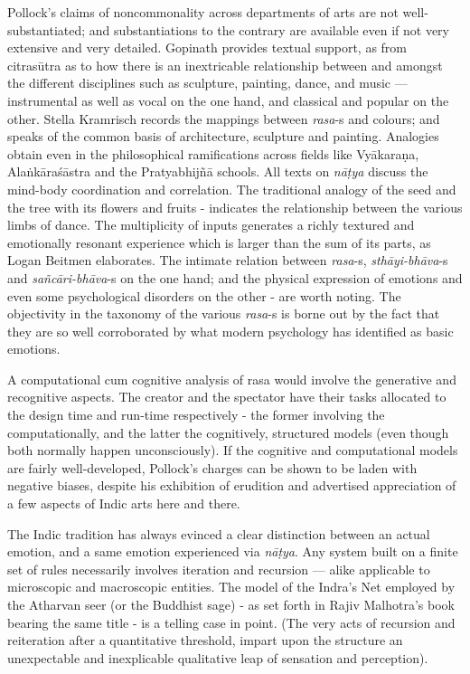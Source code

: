 Pollock’s claims of noncommonality across departments of arts are not well-substantiated; and substantiations to the contrary are available even if not very extensive and very detailed. Gopinath provides textual support, as from citrasūtra as to how there is an inextricable relationship between and amongst the different disciplines such as sculpture, painting, dance, and music --- instrumental as well as vocal on the one hand, and classical and popular on the other. Stella Kramrisch records the mappings between \textsl{rasa}-s and colours; and speaks of the common basis of architecture, sculpture and painting. Analogies obtain even in the philosophical ramifications across fields like Vyākaraṇa, Alaṅkāraśāstra and the Pratyabhijñā schools. All texts on \textsl{nāṭya} discuss the mind-body coordination and correlation. The traditional analogy of the seed and the tree with its flowers and fruits - indicates the relationship between the various limbs of dance. The multiplicity of inputs generates a richly textured and emotionally resonant experience which is larger than the sum of its parts, as Logan Beitmen elaborates. The intimate relation between \textsl{rasa}-s, \textsl{sthāyi-bhāva}-s and \textsl{sañcāri-bhāva}-s on the one hand; and the physical expression of emotions and even some psychological disorders on the other - are worth noting. The objectivity in the taxonomy of the various \textsl{rasa}-s is borne out by the fact that they are so well corroborated by what modern psychology has identified as basic emotions.

A computational cum cognitive analysis of rasa would involve the generative and recognitive aspects. The creator and the spectator have their tasks allocated to the design time and run-time respectively - the former involving the computationally, and the latter the cognitively, structured models (even though both normally happen unconsciously). If the cognitive and computational models are fairly well-developed,  Pollock’s charges can be shown to be laden with negative biases, despite his exhibition of erudition and advertised appreciation of a few aspects of Indic arts here and there.

The Indic tradition has always evinced a clear distinction between an actual emotion, and a same emotion experienced via \textsl{nāṭya}. Any system built on a finite set of rules necessarily involves iteration and recursion --- alike applicable to microscopic and macroscopic entities. The model of the Indra’s Net employed by the Atharvan seer (or the Buddhist sage) - as set forth in Rajiv Malhotra’s book bearing the same title - is a telling case in point. (The very acts of recursion and reiteration after a quantitative threshold, impart upon the structure an unexpectable and inexplicable qualitative leap of sensation and perception).

